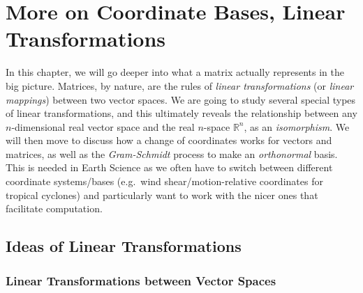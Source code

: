\chapter{More on Coordinate Bases, Linear Transformations}
\label{chap:6x}

In this chapter, we will go deeper into what a matrix actually represents in the big picture. Matrices, by nature, are the rules of \textit{linear transformations} (or \textit{linear mappings}) between two vector spaces. We are going to study several special types of linear transformations, and this ultimately reveals the relationship between any $n$-dimensional real vector space and the real $n$-space $\mathbb{R}^n$, as an \textit{isomorphism}. We will then move to discuss how a change of coordinates works for vectors and matrices, as well as the \textit{Gram-Schmidt} process to make an \textit{orthonormal} basis. This is needed in Earth Science as we often have to switch between different coordinate systems/bases (e.g.\ wind shear/motion-relative coordinates for tropical cyclones) and particularly want to work with the nicer ones that facilitate computation.

\section{Ideas of Linear Transformations}
\label{section:lineartrans}

\subsection{Linear Transformations between Vector Spaces}

